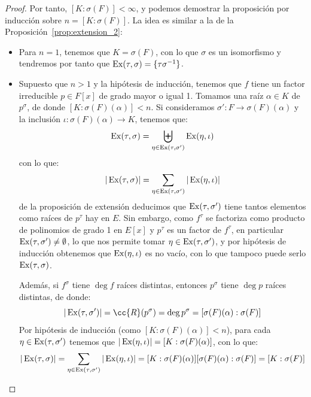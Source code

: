 \begin{prop}
\begin{proof}
        Por tanto, $[K:\sigma(F)]<\infty$, y podemos demostrar la proposición por inducción sobre $n=[K:\sigma(F)]$. La idea es similar a la de la Proposición~\ref{prop:extension_2}:
        \begin{itemize}
            \item Para $n = 1$, tenemos que $K = \sigma(F)$, con lo que $\sigma$ es un isomorfismo y tendremos por tanto que $\operatorname{Ex}(\tau,\sigma) = \{\tau\sigma^{-1}\}$.
            \item Supuesto que $n>1$ y la hipótesis de inducción, tenemos que $f$ tiene un factor irreducible $p\in F[x]$ de grado mayor o igual 1. Tomamos una raíz $\alpha\in K$ de $p^\sigma$, de donde $[K:\sigma(F)(\alpha)]<n$. Si consideramos $\sigma':F\to \sigma(F)(\alpha)$ y la inclusión $\iota:\sigma(F)(\alpha)\to K$, tenemos que:
                \begin{equation*}
                    \operatorname{Ex}(\tau,\sigma) = \biguplus_{\eta\in \operatorname{Ex}(\tau,\sigma')}\operatorname{Ex}(\eta,\iota)
                \end{equation*}
                con lo que:
                \begin{equation*}
                    |\operatorname{Ex}(\tau,\sigma)| = \sum_{\eta \in  \operatorname{Ex}(\tau, \sigma')}|\operatorname{Ex}(\eta,\iota)|
                \end{equation*}
                de la proposición de extensión deducimos que $\operatorname{Ex}(\tau,\sigma')$ tiene tantos elementos como raíces de $p^\tau$ hay en $E$. Sin embargo, como $f^\tau$ se factoriza como producto de polinomios de grado 1 en $E[x]$ y $p^\tau$ es un factor de $f^\tau$, en particular $\operatorname{Ex}(\tau,\sigma')\neq \emptyset $, lo que nos permite tomar $\eta \in \operatorname{Ex}(\tau,\sigma')$, y por hipótesis de inducción obtenemos que $\operatorname{Ex}(\eta, \iota)$ es no vacío, con lo que tampoco puede serlo $\operatorname{Ex}(\tau,\sigma)$.

                Además, si $f^\sigma$ tiene $\deg f$ raíces distintas, entonces $p^\sigma$ tiene $\deg p$ raíces distintas, de donde:
                \begin{equation*}
                    |\Ex(\tau,\sigma')| = \cc{R}(p^\sigma) = \deg p^{\sigma} = [\sigma(F)(\alpha):\sigma(F)]
                \end{equation*}
                Por hipótesis de inducción (como $[K:\sigma(F)(\alpha)]<n$), para cada $\eta \in \operatorname{Ex}(\tau,\sigma')$ tenemos que $|\operatorname{Ex}(\eta, \iota)| = [K:\sigma(F)(\alpha)]$, con lo que:
                \begin{equation*}
                    |\operatorname{Ex}(\tau,\sigma)| = \sum_{\eta \in  \operatorname{Ex}(\tau, \sigma')}|\operatorname{Ex}(\eta,\iota)| = [K:\sigma(F)(\alpha)][\sigma(F)(\alpha):\sigma(F)] = [K:\sigma(F)]\qedhere
                \end{equation*}
        \end{itemize}
    \end{proof}
\end{prop}

